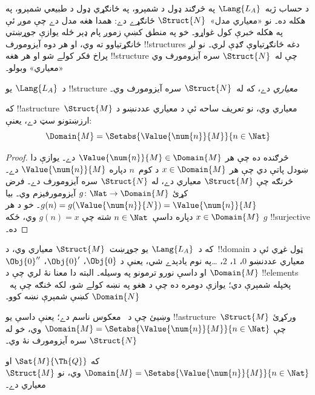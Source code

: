 \documentclass[../../../include/open-logic-section]{subfiles}
\begin{document}

د حساب ژبه~$\Lang{L_A}$ په څرګند ډول د شمېرو، په ځانګړي ډول د
طبيعي شمېرو، په هکله ده۔ نو «معياري مدل»~$\Struct{N}$ ځانګړے دے:
همدا هغه مدل دے چې موږ ئې په هکله خبرې کول غواړو۔ خو په منطق کښې
زموږ پام ډېر ځله يوازې جوړښتي ځانګړتياوو ته وي، او هر دوه آيزومورف
!!{structure}s دغه ځانګړتياوې ګډې لري۔ نو لږ پراخ فکر کولے شو او
هر هغه !!{structure} چې له~$\Struct{N}$ سره آيزومورف وي «معياري»
وبولو۔

\begin{defn}
د~$\Lang{L_A}$ يو !!{structure} \emph{معياري} دے، که له~$\Struct{N}$
سره آيزومورف وي۔
\end{defn}

\begin{prop}
 که !!a{structure}~$\Struct{M}$ معياري
وي، نو تعريف ساحه ئې د معياري عددنښو د ارزښتونو سټ دے، يعنې:
\[
\Domain{M} = \Setabs{\Value{\num{n}}{M}}{n \in \Nat}
\]
\end{prop}

\begin{proof}
څرګنده ده چې هر $\Value{\num{n}}{M} \in \Domain{M}$ دے۔ يوازې دا
ښودل پاتې دي چې هر $x \in \Domain{M}$ د کوم~$n$ دپاره
$\Value{\num{n}}{M}$ دے۔ څرنګه چې $\Struct{M}$ معياري دے، له
$\Struct{N}$ سره آيزومورف دے۔ فرض کړئ $g\colon \Nat \to \Domain{M}$
آيزومورفيزم وي۔ بيا $g(n) = g(\Value{\num{n}}{N}) =
\Value{\num{n}}{M}$۔ خو د هر $x \in \Domain{M}$ دپاره داسې~$n \in
\Nat$ شته چې $g(n) = x$ وي، ځکه $g$ !!{surjective} ده۔
\end{proof}

\begin{explain}
که د~$\Lang{L_A}$ يو جوړښت~$\Struct{M}$ معياري وي، د~!!{domain}
ټول غړي ئې د معياري عددنښو $\num{0}$، $\num{1}$، $\num{2}$،
\dots په نوم يادېدے شي، يعنې د $\Obj{0}$، $\Obj{0}'$،
$\Obj{0}''$ او داسې نورو ترمونو په وسيله۔ البته دا معنا نۀ لري چې د
$\Domain{M}$ !!{element}s پخپله شمېرې دي؛ يوازې دومره ده چې د هغو
په نښه کولے شو، لکه څنګه چې په~$\Domain{N}$ کښې شمېرې نښه کوو۔
\end{explain}

\begin{prob}
وښيئ چې د~ معکوس ناسم دے؛
يعنې داسې يو !!a{structure}~$\Struct{M}$ ورکړئ چې
$\Domain{M} = \Setabs{\Value{\num{n}}{M}}{n \in \Nat}$ وي، خو له
$\Struct{N}$ سره آيزومورف نۀ وي۔
\end{prob}

\begin{prop}
که $\Sat{M}{\Th{Q}}$ او $\Domain{M} =
\Setabs{\Value{\num{n}}{M}}{n \in \Nat}$ وي، نو $\Struct{M}$ معياري دے۔
\end{prop}
\end{document}
